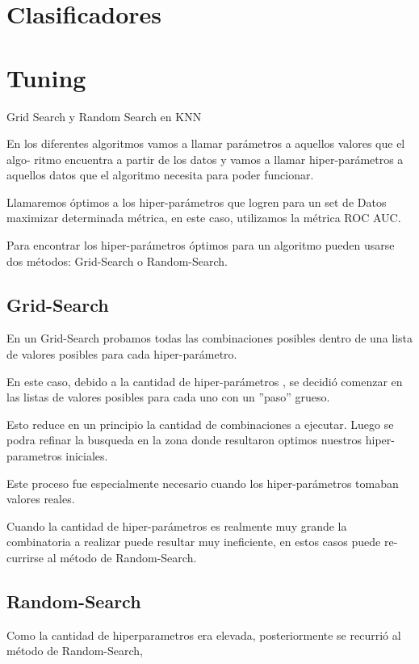 \documentclass[a4paper ,12pt]{article}
\begin{document}
\newpage
\section{Clasificadores}

\newpage
\section{Tuning}

Grid Search y Random Search en KNN

En los diferentes algoritmos vamos a llamar parámetros a aquellos valores que el algo-
ritmo encuentra a partir de los datos y vamos a llamar hiper-parámetros a
aquellos datos que el algoritmo necesita para poder funcionar.

Llamaremos óptimos a los hiper-parámetros que logren para un set de Datos maximizar determinada métrica, en este caso, utilizamos la métrica ROC AUC.\

Para encontrar los hiper-parámetros óptimos para un algoritmo pueden usarse dos métodos: Grid-Search o Random-Search.\\

\subsection{Grid-Search}

En un Grid-Search probamos todas las combinaciones posibles dentro de una lista de valores posibles para cada hiper-parámetro.

En este caso, debido a la cantidad de hiper-parámetros , se decidió comenzar en las listas de valores posibles para cada uno con un ”paso” grueso.

Esto reduce en un principio la cantidad de combinaciones a ejecutar. Luego se podra refinar la busqueda en la zona donde resultaron optimos nuestros hiper-parametros iniciales.

Este proceso fue especialmente necesario cuando los hiper-parámetros tomaban valores reales.

Cuando la cantidad de hiper-parámetros es realmente muy grande la combinatoria a realizar puede resultar muy ineficiente, en estos casos puede re-
currirse al método de Random-Search.

\subsection{Random-Search}

Como la cantidad de hiperparametros era elevada, posteriormente se recurrió al método de Random-Search,
\end{document}
